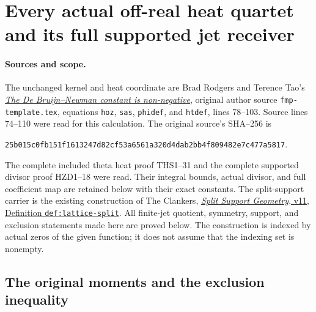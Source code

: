 \section{Every actual off-real heat quartet and its full supported jet receiver}
\label{sec:full-support-heat-quartet}

\paragraph{Sources and scope.}
The unchanged kernel and heat coordinate are Brad Rodgers and Terence
Tao's \href{https://arxiv.org/abs/1801.05914v5}{\emph{The De
Bruijn--Newman constant is non-negative}}, original author source
\nolinkurl{fmp-template.tex}, equations \texttt{hoz}, \texttt{sas},
\texttt{phidef}, and \texttt{htdef}, lines 78--103. Source lines
74--110 were read for this calculation. The original source's
SHA--256 is
\begin{center}\small
\nolinkurl{25b015c0fb151f1613247d82cf53a6561a320d4dab2bb4f809482e7c477a5817}.
\end{center}
The complete included theta heat proof THS1--31 and the complete
supported divisor proof HZD1--18 were read.
Their integral bounds, actual divisor, and full coefficient map are
retained below with their exact constants. The split-support carrier
is the existing construction of The Clankers,
\href{https://github.com/KokunoYumeto/zeta-function-research-reader/blob/a2851f9eb352e7e4376bc629de86fa4ed9c1c434/workbenches/splitzero-tandem/foundations/split-support-geometry-v11/split_support_geometry_arithmetic_curve_v11.tex#L1226}{\emph{Split
Support Geometry}, v11, Definition \texttt{def:lattice-split}}.
All finite-jet quotient, symmetry, support, and exclusion statements
made here are proved below. The construction is indexed by actual
zeros of the given function; it does not assume that the indexing
set is nonempty.

\subsection{The original moments and the exclusion inequality}

